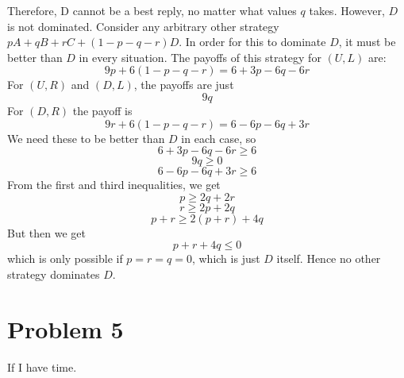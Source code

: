 \documentclass[10pt,letter]{article}
\begin{document}
Therefore, D cannot be a best reply, no matter what values $q$ takes. However, $D$ is not dominated. Consider any arbitrary other strategy $pA + qB + rC + (1-p-q-r)D$. In order for this to dominate $D$, it must be better than $D$ in every situation. The payoffs of this strategy for $(U, L)$ are:
\[ 9p + 6(1-p-q-r) = 6 + 3p - 6q - 6r \]
For $(U, R)$ and $(D,L)$, the payoffs are just
\[ 9q \]
For $(D, R)$ the payoff is
\[ 9r + 6(1-p-q-r) = 6 - 6p - 6q + 3r \]
We need these to be better than $D$ in each case, so
\[ 6 + 3p - 6q - 6r \ge 6 \]
\[ 9q \ge 0 \]
\[ 6 - 6p - 6q + 3r \ge 6 \]
From the first and third inequalities, we get
\[ p \ge 2q + 2r \]
\[ r \ge 2p + 2q \]
\[ p + r \ge 2(p + r) + 4q \]
But then we get
\[ p + r + 4q \le 0 \]
which is only possible if $p = r = q = 0$, which is just $D$ itself. Hence no other strategy dominates $D$.

\section*{Problem 5}
If I have time.
\end{document}
